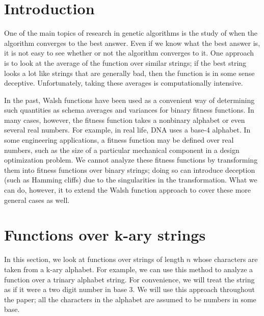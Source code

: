 



\section{Introduction}
One of the main topics of research in genetic algorithms is the study of
when the algorithm converges to the best answer.  Even if we know what
the best answer is, it is not easy to see whether or not the algorithm
converges to it.  One approach is to look at the average of the function
over similar strings; if the best string looks a lot like strings that
are generally bad, then the function is in some sense deceptive.
Unfortunately, taking these averages is computationally intensive.

In the past, Walsh functions have been used as a convenient way of
determining such quantities as schema averages and variances for binary
fitness functions.  In many cases, however, the fitness function takes a
nonbinary alphabet or even several real numbers.  For example, in real life,
DNA uses a base-4 alphabet.  In some engineering applications, a fitness
function may be defined over real numbers, such as the size of a particular
mechanical component in a design optimization problem.  We cannot analyze
these fitness functions by transforming them into fitness functions over
binary strings; doing so can introduce deception (such as Hamming cliffs)
due to the singularities in the transformation.  What we can do, however,
it to extend the Walsh function approach to cover these more general
cases as well.


\section{Functions over k-ary strings}
In this section, we look at functions over strings of length $n$ whose
characters are
taken from a k-ary alphabet.  For example, we can use this method to analyze
a function over a trinary alphabet string.  For convenience, we will
treat the string as if it were a two digit number in base 3.  We will use
this approach throughout the paper; all the characters in the alphabet
are assumed to be numbers in some base.

